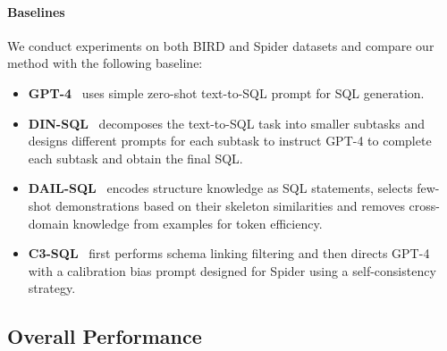 \paragraph{Baselines} We conduct experiments on both BIRD and Spider datasets and compare our method with the following baseline:
\begin{itemize}
    \item \textbf{GPT-4}~\citep{OpenAI2023GPT4TR} uses simple zero-shot text-to-SQL prompt for SQL generation.
    \item \textbf{DIN-SQL}~\citep{pourreza2023dinsql} decomposes the text-to-SQL task into smaller subtasks and designs different prompts for each subtask to instruct GPT-4  to complete each subtask and obtain the final SQL.
    \item \textbf{DAIL-SQL}~\citep{gao2023texttosql} encodes structure knowledge as SQL statements, selects few-shot demonstrations based on their skeleton similarities and removes cross-domain knowledge from examples for token efficiency.
    \item \textbf{C3-SQL}~\citep{dong2023c3} first performs schema linking filtering and then directs GPT-4 with a calibration bias prompt designed for Spider using a self-consistency strategy.
\end{itemize}

\subsection{Overall Performance}

